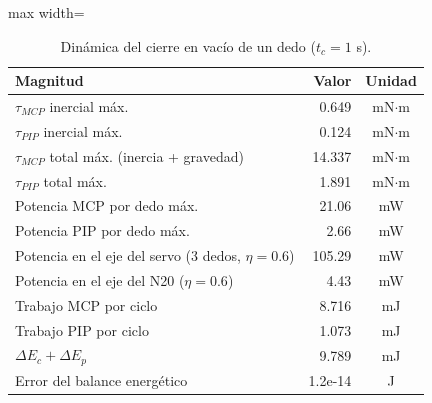 \begin{table}[H]
\centering

\begin{adjustbox}{max width=\textwidth}
\begin{tabular}{|l|r|c|}
\hline
\textbf{Magnitud} & \textbf{Valor} & \textbf{Unidad} \\ \hline
$\tau_{MCP}$ inercial máx. & 0.649 & mN$\cdot$m \\ \hline
$\tau_{PIP}$ inercial máx. & 0.124 & mN$\cdot$m \\ \hline
$\tau_{MCP}$ total máx. (inercia + gravedad) & 14.337 & mN$\cdot$m \\ \hline
$\tau_{PIP}$ total máx. & 1.891 & mN$\cdot$m \\ \hline
Potencia MCP por dedo máx. & 21.06 & mW \\ \hline
Potencia PIP por dedo máx. & 2.66 & mW \\ \hline
Potencia en el eje del servo (3 dedos, $\eta=0.6$) & 105.29 & mW \\ \hline
Potencia en el eje del N20 ($\eta=0.6$) & 4.43 & mW \\ \hline
Trabajo MCP por ciclo & 8.716 & mJ \\ \hline
Trabajo PIP por ciclo & 1.073 & mJ \\ \hline
$\Delta E_c + \Delta E_p$ & 9.789 & mJ \\ \hline
Error del balance energético & 1.2e-14 & J \\ \hline
\end{tabular}
\end{adjustbox}
\caption{Dinámica del cierre en vacío de un dedo ($t_c = 1$ s).}
\label{tab:dinamica}
\end{table}